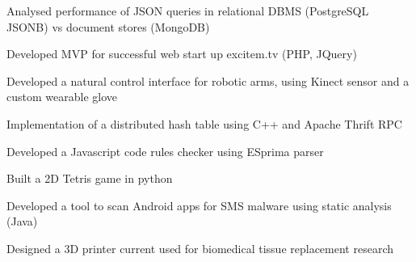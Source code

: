
\begin{cventries}

\begin{cvitems} %
    \item {Analysed performance of JSON queries in relational DBMS (PostgreSQL JSONB) vs document stores (MongoDB)}
    \item {Developed MVP for successful web start up excitem.tv (PHP, JQuery)}
    \item {Developed a natural control interface for robotic arms, using Kinect sensor and a custom wearable glove}
    \item {Implementation of a distributed hash table using C++ and Apache Thrift RPC}
    \item {Developed a Javascript code rules checker using ESprima parser}
    \item {Built a 2D Tetris game in python}
    \item {Developed a tool to scan Android apps for SMS malware using static analysis (Java)}
    \item {Designed a 3D printer current used for biomedical tissue replacement research}
\end{cvitems}

\end{cventries}